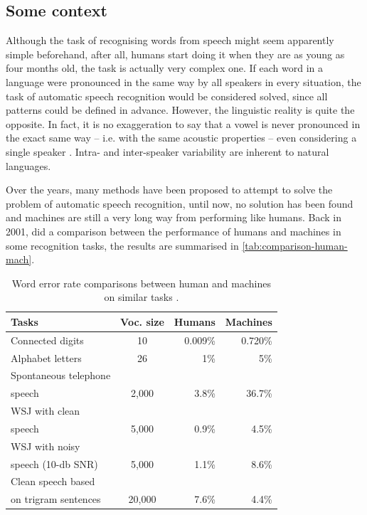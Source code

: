 \subsection{Some context}

Although the task of recognising words from speech might seem apparently simple beforehand, after all, humans start doing it when they are as young as four months old, the task is actually very complex one. If each word in a language were pronounced in the same way by all speakers in every situation, the task of automatic speech recognition would be considered solved, since all patterns could be defined in advance. However, the linguistic reality is quite the opposite. In fact, it is no exaggeration to say that a vowel is never pronounced in the exact same way -- i.e. with the same acoustic properties -- even considering a single speaker \cite{Johnson2004}. Intra- and inter-speaker variability are inherent to natural languages.

Over the years, many methods have been 
proposed to attempt to solve the problem of automatic speech recognition, until now, no solution has been found and machines are still
a very long way from performing like humans. Back in 2001, \citet{Huang2001} did a comparison between the performance of humans and machines in some recognition tasks, the results are summarised in \autoref{tab:comparison-human-mach}.

\begin{table}[!ht]
  \caption[Word error rate comparisons between human and machines on similar tasks \citep{Huang2001}.]{Word error rate comparisons between human and machines on similar tasks \citep{Huang2001}.}
  \smallskip
  \centering
  \begin{tabular}{lcrr} \toprule
      \textbf{Tasks} & \textbf{Voc. size} & \textbf{Humans} & \textbf{Machines} \\ \midrule
      \small Connected digits & 10 & 0.009\% & 0.720\% \\
      \small Alphabet letters & 26 & 1\% & 5\% \\
      \small Spontaneous telephone \\ speech & 2,000 & 3.8\% & 36.7\% \\
      \small WSJ with clean \\ \small speech & 5,000 & 0.9\% & 4.5\% \\
      \small WSJ with noisy \\ \small speech (10-db SNR) & 5,000 & 1.1\% & 8.6\% \\
      \small Clean speech based \\ \small on trigram sentences & 20,000 & 7.6\% & 4.4\% \\
    \bottomrule
  \end{tabular}
  \label{tab:comparison-human-mach}
\end{table}

